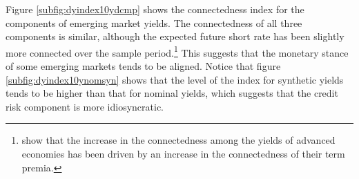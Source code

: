 
Figure \ref{subfig:dyindex10ydcmp} shows the connectedness index for the components of emerging market yields. %
The connectedness of all three components is similar, although 
the expected future short rate has been slightly more connected over the sample period.\footnote{ \cite{ACDM:2019} show that the increase in the connectedness among the yields of advanced economies has been driven by an increase in the connectedness of their term premia.} 
This suggests that the monetary stance of some emerging markets tends to be aligned.
Notice that figure \ref{subfig:dyindex10ynomsyn} shows that the level of the index for synthetic yields tends to be higher than that for nominal yields, which suggests that the credit risk component is %
more idiosyncratic. %

